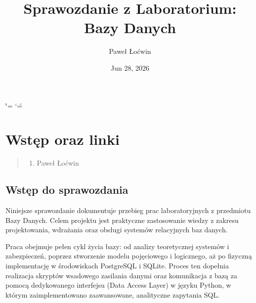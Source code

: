 \documentclass[a4paper,11pt,english,openany,oneside]{sphinxmanual}
\title{Sprawozdanie z Laboratorium: Bazy Danych}
\date{Jun 28, 2026}
\author{Paweł Łoćwin}
\begin{document}
\ifdefined\shorthandoff
  \ifnum\catcode`\=\string=\active\shorthandoff{=}\fi
  \ifnum\catcode`\"=\active{}\fi
\fi

\pagestyle{empty}
\sphinxmaketitle
\pagestyle{plain}
\sphinxtableofcontents
\pagestyle{normal}
\label{\detokenize{index::doc}}


\sphinxstepscope


\chapter{Wstęp oraz linki}
\label{\detokenize{rozdzial_1/index:wstep-oraz-linki}}\label{\detokenize{rozdzial_1/index::doc}}\begin{quote}\begin{description}
\begin{enumerate}
%
\item {} 
\sphinxAtStartPar
Paweł Łoćwin

\end{enumerate}

\end{description}\end{quote}


\section{Wstęp do sprawozdania}
\label{\detokenize{rozdzial_1/index:wstep-do-sprawozdania}}
\sphinxAtStartPar
Niniejsze sprawozdanie dokumentuje przebieg prac laboratoryjnych z przedmiotu Bazy Danych. Celem projektu jest praktyczne zastosowanie wiedzy z zakresu projektowania, wdrażania oraz obsługi systemów relacyjnych baz danych.

\sphinxAtStartPar
Praca obejmuje pełen cykl życia bazy: od analizy teoretycznej systemów i zabezpieczeń, poprzez stworzenie modelu pojęciowego i logicznego, aż po fizyczną implementację w środowiskach PostgreSQL i SQLite. Proces ten dopełnia realizacja skryptów wsadowego zasilania danymi oraz komunikacja z bazą za pomocą dedykowanego interfejsu (Data Access Layer) w języku Python, w którym zaimplementowano zaawansowane, analityczne zapytania SQL.
\end{document}
